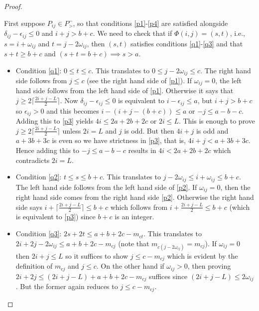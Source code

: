 \documentclass[11pt,reqno]{amsart}
\theoremstyle{definition}
\numberwithin{equation}{section}
\begin{document}
\begin{proof}
\begin{enumerate}
First suppose $P_{ij} \in P_>^-$, so that conditions \eqref{p1}-\eqref{p4} are satisfied alongside 
$\delta_{ij}-\epsilon_{ij} \leqslant 0$ and $i+j>b+c$.  We need to check that if $\Phi(i,j)=(s,t)$, i.e., $s=i+\omega_{ij}$ 
and $t=j-2\omega_{ij}$, then $(s,t)$ satisfies conditions \eqref{q1}-\eqref{q3} and that $s+t \geqslant b+c$ and 
$(s+t=b+c) \implies s>a$. 

\begin{itemize}
 \item Condition \eqref{q1}: $0 \leqslant t \leqslant c$.  This translates to $0 \leqslant j-2\omega_{ij} \leqslant c$. The right hand 
 side follows from $j \leqslant c$ (see the right hand side of \eqref{p1}).  If $\omega_{ij}=0$, the left hand side follows 
 from the left hand side of \eqref{p1}.  Otherwise it says that $j \geqslant 2\lceil\frac{2i+j-L}{2}\rceil$.  Now 
 $\delta_{ij}-\epsilon_{ij}\leqslant 0$ is equivalent to $i - \epsilon_{ij} \leqslant a$, but $i+j > b+c$ so $\epsilon_{ij}>0$ 
 and this  becomes $i-(i+j-(b+c)) \leqslant a$ or $-j \leqslant a-b-c$. Adding this to \eqref{p3} yields $4i \leqslant 2a+2b+2c$ 
 or $2i \leqslant L$.  This is enough to prove  $j \geqslant 2\lceil\frac{2i+j-L}{2}\rceil$ unless $2i=L$ and $j$ is odd.  But 
 then $4i+j$ is odd and $a+3b+3c$ is even so we have strictness in \eqref{p3}, that is, $4i+j < a+3b+3c$.  Hence adding this to 
 $-j \leqslant a-b-c$ results in $4i < 2a+2b+2c$ which contradicts $2i=L$.
 
 \item Condition \eqref{q2}: $t \leqslant s \leqslant b+c$. This translates to $j-2\omega_{ij} \leqslant i+\omega_{ij} \leqslant b+c$.
 The left hand side follows from the left hand side of \eqref{p2}.  If $\omega_{ij}=0$, then the right hand side comes from the 
 right hand side \eqref{p2}.  Otherwise the right hand side says $i+\lceil\frac{2i+j-L}{2}\rceil \leqslant b+c$ which follows from 
 $i+\frac{2i+j-L}{2} \leqslant b+c$ (which is equivalent to \eqref{p3}) since $b+c$ is an integer.
 
 \item Condition \eqref{q3}: $2s+2t \leqslant a+b+2c-m_{ct}$.  This translates to $2i+2j-2\omega_{ij}\leqslant a+b+2c-m_{cj}$ 
 (note that $m_{c(j-2\omega_{ij})}=m_{cj}$). If $\omega_{ij}=0$ then $2i+j \leqslant L$ so it suffices to show 
 $j \leqslant c-m_{cj}$ which is evident by the definition of $m_{cj}$ and $j \leqslant c$. On the other hand if 
 $\omega_{ij}>0$, then proving $2i+2j \leqslant (2i+j-L)+ a+b+2c-m_{cj}$ suffices since $(2i+j-L) \leqslant 2\omega_{ij}$.  
 But the former again reduces to  $j \leqslant c-m_{cj}$.
 

\end{itemize}
\end{enumerate}
\end{proof}
\end{document}
